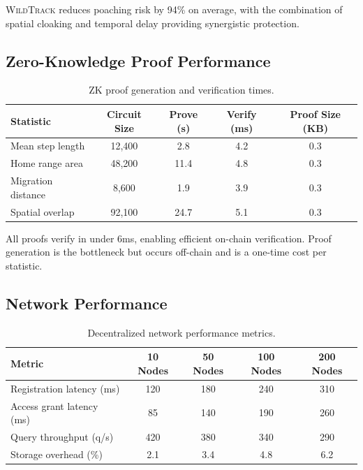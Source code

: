\documentclass[11pt,letterpaper]{article}
\newcommand{\WildTrack}{\textsc{WildTrack}}
\begin{document}
\WildTrack{} reduces poaching risk by 94\% on average, with the combination of spatial cloaking and temporal delay providing synergistic protection.

\subsection{Zero-Knowledge Proof Performance}

\begin{table}[htbp]
\centering
\caption{ZK proof generation and verification times.}
\label{tab:zk_perf}
\begin{tabular}{lcccc}
\toprule
\textbf{Statistic} & \textbf{Circuit Size} & \textbf{Prove (s)} & \textbf{Verify (ms)} & \textbf{Proof Size (KB)} \\
\midrule
Mean step length & 12,400 & 2.8 & 4.2 & 0.3 \\
Home range area & 48,200 & 11.4 & 4.8 & 0.3 \\
Migration distance & 8,600 & 1.9 & 3.9 & 0.3 \\
Spatial overlap & 92,100 & 24.7 & 5.1 & 0.3 \\
\bottomrule
\end{tabular}
\end{table}

All proofs verify in under 6ms, enabling efficient on-chain verification. Proof generation is the bottleneck but occurs off-chain and is a one-time cost per statistic.

\subsection{Network Performance}

\begin{table}[htbp]
\centering
\caption{Decentralized network performance metrics.}
\label{tab:network}
\begin{tabular}{lcccc}
\toprule
\textbf{Metric} & \textbf{10 Nodes} & \textbf{50 Nodes} & \textbf{100 Nodes} & \textbf{200 Nodes} \\
\midrule
Registration latency (ms) & 120 & 180 & 240 & 310 \\
Access grant latency (ms) & 85 & 140 & 190 & 260 \\
Query throughput (q/s) & 420 & 380 & 340 & 290 \\
Storage overhead (\%) & 2.1 & 3.4 & 4.8 & 6.2 \\
\bottomrule
\end{tabular}
\end{table}
\end{document}
